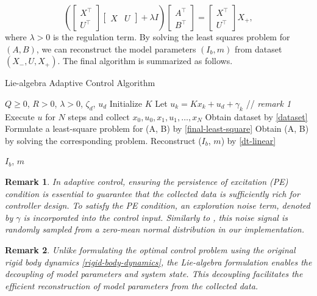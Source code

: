 \documentclass[lettersize,journal]{IEEEtran}
\newtheorem{myrem}{Remark}
\begin{document}
\begin{equation} \label{final-least-square}
    (\begin{bmatrix}
        X^{\top} \\ U^{\top}
    \end{bmatrix}
    \begin{bmatrix}
        X & U
    \end{bmatrix} + \lambda I)
    \begin{bmatrix}
        A^{\top} \\ B^{\top}
    \end{bmatrix} = 
    \begin{bmatrix}
        X^{\top} \\ U^{\top}
    \end{bmatrix} X_{+},
\end{equation}
where $\lambda > 0$ is the regulation term. 
By solving the least squares problem for $(A, B)$, we can reconstruct the model parameters $(I_b, m)$ from dataset $(X_{-}, U, X_{+})$. The final algorithm is summarized as follows.
\begin{algorithm}[h]
\caption{Lie-algebra Adaptive Control Algorithm}\label{alg: lie-algebra-adaptive}
\begin{algorithmic}
\Require $Q \geq 0$, $R > 0$, $\lambda > 0$, $\zeta_d$, $u_d$
\Require Initialize $K$
\State Let ${u}_k = K x_k +u_d+ \gamma_k$ // \textit{remark 1}  
\State Execute $u$ for $N$ steps and collect $x_0,u_0,x_1,u_1,\ldots,x_{N}$
\State Obtain dataset by \eqref{dataset}
\State Formulate a least-square problem for (A, B) by \eqref{final-least-square}
\State Obtain (A, B) by solving the corresponding problem.
\State Reconstruct ($I_b$, $m$) by \eqref{dt-linear}

\State \Return $I_b$, $m$
\end{algorithmic}
\end{algorithm}
\begin{myrem}
In adaptive control, ensuring the persistence of excitation (PE) condition \cite{rl-fbc} is essential to guarantee that the collected data is sufficiently rich for controller design. To satisfy the PE condition, an exploration noise term, denoted by $\gamma$ is incorporated into the control input. Similarly to \cite{dean2018regret,abeille2017thompson}, this noise signal is randomly sampled from a zero-mean normal distribution in our implementation.
\end{myrem}
\begin{myrem}
    Unlike formulating the optimal control problem using the original rigid body dynamics \eqref{rigid-body-dynamics}, the Lie-algebra formulation enables the decoupling of model parameters and system state. This decoupling facilitates the efficient reconstruction of model parameters from the collected data.  
\end{myrem}
\end{document}
